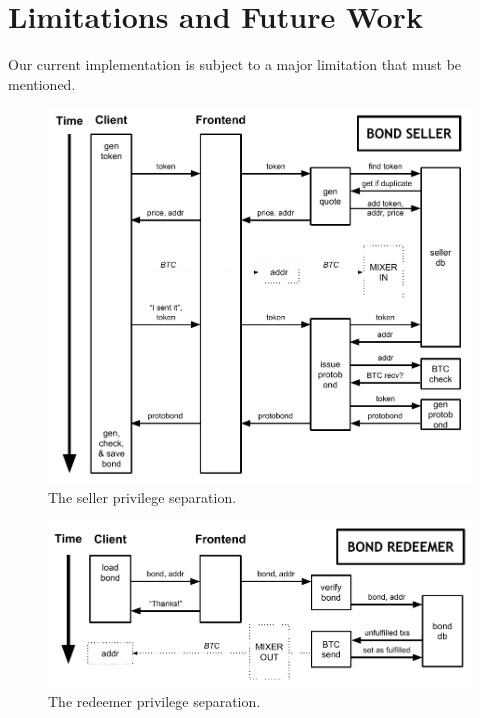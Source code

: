 \documentclass[12pt]{article}
\begin{document}
\section{Limitations and Future Work}
Our current implementation is subject to a major limitation that must be mentioned.


\begin{figure}[ht]
\begin{center}
\includegraphics[width=14cm]{dryer21-bond-seller-diagram.pdf}
\end{center}
\caption{The seller privilege separation.\label{seller}}
\end{figure}
\begin{figure}[ht]
\begin{center}
\includegraphics[width=14cm]{dryer21-bond-redeemer-diagram.pdf}
\end{center}
\caption{The redeemer privilege separation.\label{seller}}
\end{figure}
\end{document}
